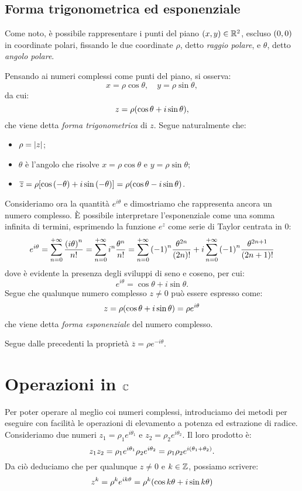     \subsection{Forma trigonometrica ed esponenziale}
        Come noto, \`e possibile rappresentare i punti del piano $\qty(x,y)\in\mathbb{R}^2$, escluso $\qty(0,0)$ in coordinate polari, fissando le due coordinate $\rho$, detto \emph{raggio polare}, e $\theta$, detto \emph{angolo polare}. \par Pensando ai numeri complessi come punti del piano, si osserva: $$x=\rho\cos\theta,\quad y=\rho\sin\theta,$$ da cui: $$z=\rho\qty(\cos\theta+i\sin\theta),$$ che viene detta \emph{forma trigonometrica} di $z$. Segue naturalmente che:
        \begin{itemize}
            \item $\rho=\abs{z}$;
            \item $\theta$ \`e l'angolo che risolve $x=\rho\cos\theta$ e $y=\rho\sin\theta$;
            \item $\overline{z}=\rho\qty[\cos\qty(-\theta)+i\sin\qty(-\theta)]=\rho\qty(\cos\theta-i\sin\theta)$.
        \end{itemize}
        \par Consideriamo ora la quantit\`a $e^{i\theta}$ e dimostriamo che rappresenta ancora un numero complesso. \`E possibile interpretare l'esponenziale come una somma infinita di termini, esprimendo la funzione $e^z$ come serie di Taylor centrata in $0$: $$e^{i\theta}=\sum_{n=0}^{+\infty}\frac{\qty(i\theta)^n}{n!}=\sum_{n=0}^{+\infty}i^n\frac{\theta^n}{n!}=\sum_{n=0}^{+\infty}\qty(-1)^n\frac{\theta^{2n}}{\qty(2n)!}+i\sum_{n=0}^{+\infty}\qty(-1)^n\frac{\theta^{2n+1}}{\qty(2n+1)!}$$ dove \`e evidente la presenza degli sviluppi di seno e coseno, per cui: $$e^{i\theta}=\cos\theta+i\sin\theta.$$ Segue che qualunque numero complesso $z\neq 0$ pu\`o essere espresso come: $$z=\rho\qty(\cos\theta+i\sin\theta)=\rho e^{i\theta}$$ che viene detta \emph{forma esponenziale} del numero complesso. \par Segue dalle precedenti la propriet\`a $\overline{z}=\rho e^{-i\theta}$.
    \section{Operazioni in $\mathbb{C}$}
        Per poter operare al meglio coi numeri complessi, introduciamo dei metodi per eseguire con facilit\`a le operazioni di elevamento a potenza ed estrazione di radice. Consideriamo due numeri $z_1=\rho_1e^{i\theta_1}$ e $z_2=\rho_2e^{i\theta_2}$. Il loro prodotto \`e: $$z_1z_2=\rho_1e^{i\theta_1}\rho_2e^{i\theta_2}=\rho_1\rho_2e^{i\qty(\theta_1+\theta_2)}.$$ Da ci\`o deduciamo che per qualunque $z\neq 0$ e $k\in\mathbb{Z}$, possiamo scrivere: $$z^k=\rho^ke^{ik\theta}=\rho^k\qty(\cos k\theta+i\sin k\theta)$$
        




